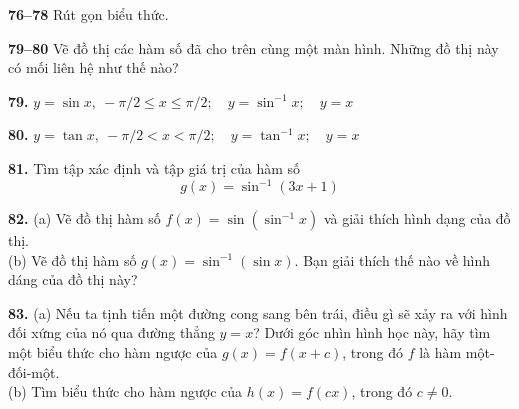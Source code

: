 \begin{minipage}[t]{0.482\textwidth}
\noindent\textbf{\textsf{\color{stewartcyan}76--78}} Rút gọn biểu thức.

\medskip
\noindent
{}%
% 

\par\vspace{1.5mm}\noindent{\color{stewartcyan}\rule{\linewidth}{0.4pt}}\par\vspace{1.5mm}

\noindent\graphicon\;\textbf{\textsf{\color{stewartcyan}79--80}} Vẽ đồ thị các hàm số đã cho trên cùng một màn hình. Những đồ thị này có mối liên hệ như thế nào?

\medskip
\noindent\textbf{79.} $y = \sin x,\ -\pi/2 \le x \le \pi/2;\quad y = \sin^{-1} x;\quad y = x$

\smallskip
\noindent\textbf{80.} $y = \tan x,\ -\pi/2 < x < \pi/2;\quad y = \tan^{-1} x;\quad y = x$

\par\vspace{1.5mm}\noindent{\color{stewartcyan}\rule{\linewidth}{0.4pt}}\par\vspace{1.5mm}

\noindent\textbf{81.} Tìm tập xác định và tập giá trị của hàm số
\[
g(x) = \sin^{-1}(3x + 1)
\]

\noindent\graphicon\;\textbf{82.} (a) Vẽ đồ thị hàm số $f(x) = \sin(\sin^{-1} x)$ và giải thích hình dạng của đồ thị.\\
\hspace*{9.5mm}(b) Vẽ đồ thị hàm số $g(x) = \sin^{-1}(\sin x)$. Bạn giải thích thế nào về hình dáng của đồ thị này?

\medskip
\noindent\textbf{83.} (a) Nếu ta tịnh tiến một đường cong sang bên trái, điều gì sẽ xảy ra với hình đối xứng của nó qua đường thẳng $y = x$? Dưới góc nhìn hình học này, hãy tìm một biểu thức cho hàm ngược của $g(x) = f(x + c)$, trong đó $f$ là hàm một-đối-một.\\
\hspace*{5.5mm}(b) Tìm biểu thức cho hàm ngược của $h(x) = f(cx)$, trong đó $c \ne 0$.
\end{minipage}